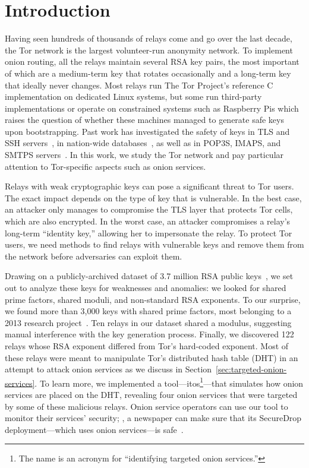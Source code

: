 \section{Introduction}
Having seen hundreds of thousands of relays come and go over the last decade,
the Tor network is the largest volunteer-run anonymity network.  To implement
onion routing, all the relays maintain several RSA key pairs, the most important
of which are a medium-term key that rotates occasionally and a long-term key
that ideally never changes.  Most relays run The Tor Project's reference C
implementation on dedicated Linux systems, but some run third-party
implementations or operate on constrained systems such as Raspberry Pis which
raises the question of whether these machines managed to generate safe keys upon
bootstrapping.  Past work has investigated the safety of keys in TLS and SSH
servers~\cite{Heninger2012a}, in nation-wide databases~\cite{Bernstein2013a}, as
well as in POP3S, IMAPS, and SMTPS servers~\cite{Hastings2016a}.  In this work,
we study the Tor network and pay particular attention to Tor-specific aspects
such as onion services.

Relays with weak cryptographic keys can pose a significant threat to Tor users.
The exact impact depends on the type of key that is vulnerable.  In the best
case, an attacker only manages to compromise the TLS layer that protects Tor
cells, which are also encrypted.  In the worst case, an attacker compromises a
relay's long-term ``identity key,'' allowing her to impersonate the relay.  To
protect Tor users, we need methods to find relays with vulnerable keys and
remove them from the network before adversaries can exploit them.

Drawing on a publicly-archived dataset of 3.7 million RSA public
keys~\cite{collector}, we set out to analyze these keys for weaknesses and
anomalies: we looked for shared prime factors, shared moduli, and non-standard
RSA exponents.  To our surprise, we found more than 3,000 keys with shared prime
factors, most belonging to a 2013 research project~\cite{Biryukov2013a}.  Ten
relays in our dataset shared a modulus, suggesting manual interference with the
key generation process.  Finally, we discovered 122 relays whose RSA exponent
differed from Tor's hard-coded exponent.  Most of these relays were meant to
manipulate Tor's distributed hash table (DHT) in an attempt to attack onion
services as we discuss in Section~\ref{sec:targeted-onion-services}.  To learn
more, we implemented a tool---itos\footnote{The name is an acronym for
``identifying targeted onion services.''}---that simulates how onion services
are placed on the DHT, revealing four onion services that were targeted by some
of these malicious relays.  Onion service operators can use our tool to monitor
their services' security; \eg, a newspaper can make sure that its SecureDrop
deployment---which uses onion services---is safe~\cite{securedrop}.

